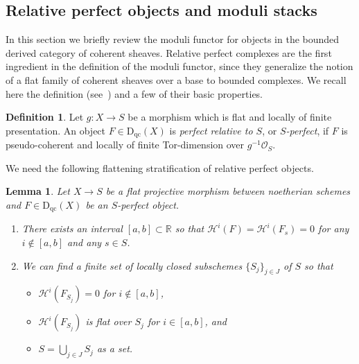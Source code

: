\documentclass[11pt, reqno]{amsart}
\numberwithin{equation}{section}
\theoremstyle{plain}
\newtheorem{lemma}[theorem]{Lemma}
\theoremstyle{remark}
\theoremstyle{definition}
\newtheorem{definition}[theorem]{Definition}
\theoremstyle{italicsname}
\newcommand{\Dqc}{\mathrm{D}_{\mathrm{qc}}}
\newcommand{\cO}{\mathcal{O}}
\newcommand{\cH}{\mathcal{H}}
\def\RR{\ensuremath{\mathbb{R}}}
\def\citestacks#1{\cite[\href{https://stacks.math.columbia.edu/tag/#1}{#1}]{stacks-project}}
\begin{document}
\subsection{Relative perfect objects and moduli stacks}\label{subsec:PerfectStacks}

In this section we briefly review the moduli functor for objects in the bounded derived category of coherent sheaves.
Relative perfect complexes are the first ingredient in the definition of the moduli functor, since they generalize the notion of a flat family of coherent sheaves over a base to bounded complexes.
We recall here the definition (see~\citestacks{0DI0}) and a few of their basic properties.

\begin{definition}\label{def:RelativePerfect}
Let $g\colon X\to S$ be a morphism which is flat and locally of finite presentation. An object $F\in\Dqc(X)$ is \emph{perfect relative to $S$}, or \emph{$S$-perfect}, if $F$ is pseudo-coherent and locally of finite Tor-dimension over $g^{-1}\cO_S$.
\end{definition}

We need the following flattening stratification of relative perfect objects.

\begin{lemma}\label{lem:flatten}
Let $X\to S$ be a flat projective morphism between noetherian schemes and $F\in \Dqc(X)$ be an $S$-perfect object. 
\begin{enumerate}[{\rm (1)}]
\item\label{enum:flatten1} There exists an interval $[a,b]\subset\RR$ so that $\cH^i(F)=\cH^i(F_s)=0$ for any $i\notin [a,b]$ and any $s\in S$.
\item\label{enum:flatten2} We can find a finite set of locally closed subschemes $\{S_j\}_{j\in J}$ of $S$ so that
\begin{itemize}
\item $\cH^i(F_{S_j})=0$ for $i\notin [a,b]$,
\item $\cH^i(F_{S_j})$ is flat over $S_j$ for $i\in [a,b]$, and
\item $S=\bigcup_{j\in J}S_j$ as a set.
\end{itemize}
\end{enumerate}
\end{lemma}
\end{document}
